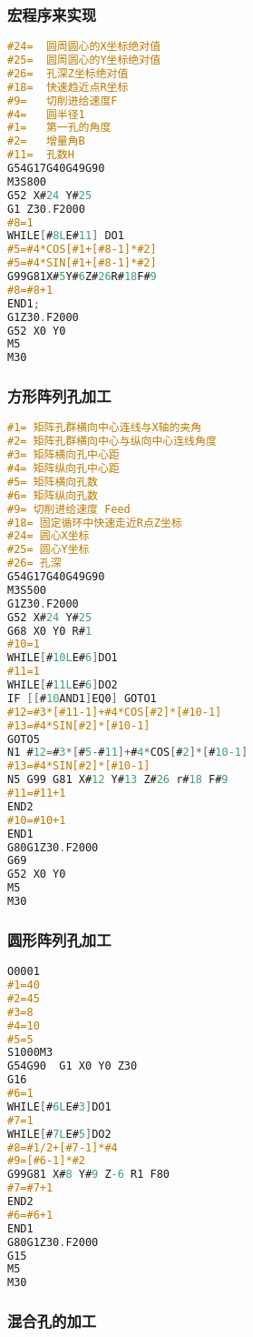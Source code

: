 \subsubsection{宏程序来实现}

\begin{lstlisting}[language=C]
#24=  圆周圆心的X坐标绝对值
#25=  圆周圆心的Y坐标绝对值 
#26=  孔深Z坐标绝对值 
#18=  快速趋近点R坐标
#9=   切削进给速度F
#4=   圆半径1
#1=   第一孔的角度
#2=   增量角B
#11=  孔数H
G54G17G40G49G90
M3S800
G52 X#24 Y#25
G1 Z30.F2000
#8=1
WHILE[#8LE#11] DO1
#5=#4*COS[#1+[#8-1]*#2]
#5=#4*SIN[#1+[#8-1]*#2]
G99G81X#5Y#6Z#26R#18F#9
#8=#8+1
END1;
G1Z30.F2000
G52 X0 Y0
M5
M30
\end{lstlisting}


\subsubsection{方形阵列孔加工}

\begin{lstlisting}[language=C]
#1= 矩阵孔群横向中心连线与X轴的夹角
#2= 矩阵孔群横向中心与纵向中心连线角度
#3= 矩阵横向孔中心距
#4= 矩阵纵向孔中心距
#5= 矩阵横向孔数
#6= 矩阵纵向孔数
#9= 切削进给速度 Feed
#18= 固定循环中快速走近R点Z坐标
#24= 圆心X坐标
#25= 圆心Y坐标
#26= 孔深
G54G17G40G49G90
M3S500
G1Z30.F2000
G52 X#24 Y#25
G68 X0 Y0 R#1
#10=1
WHILE[#10LE#6]DO1
#11=1 
WHILE[#11LE#6]DO2
IF [[#10AND1]EQ0] GOTO1
#12=#3*[#11-1]+#4*COS[#2]*[#10-1]
#13=#4*SIN[#2]*[#10-1]
GOTO5
N1 #12=#3*[#5-#11]+#4*COS[#2]*[#10-1]
#13=#4*SIN[#2]*[#10-1]
N5 G99 G81 X#12 Y#13 Z#26 r#18 F#9
#11=#11+1
END2
#10=#10+1
END1
G80G1Z30.F2000
G69
G52 X0 Y0
M5
M30
\end{lstlisting}

\subsubsection{圆形阵列孔加工}

\begin{lstlisting}[language=C]
O0001
#1=40
#2=45
#3=8
#4=10
#5=5
S1000M3
G54G90  G1 X0 Y0 Z30
G16
#6=1
WHILE[#6LE#3]DO1
#7=1
WHILE[#7LE#5]DO2
#8=#1/2+[#7-1]*#4
#9=[#6-1]*#2
G99G81 X#8 Y#9 Z-6 R1 F80
#7=#7+1
END2
#6=#6+1
END1
G80G1Z30.F2000
G15
M5
M30
\end{lstlisting}

\subsubsection{混合孔的加工}

